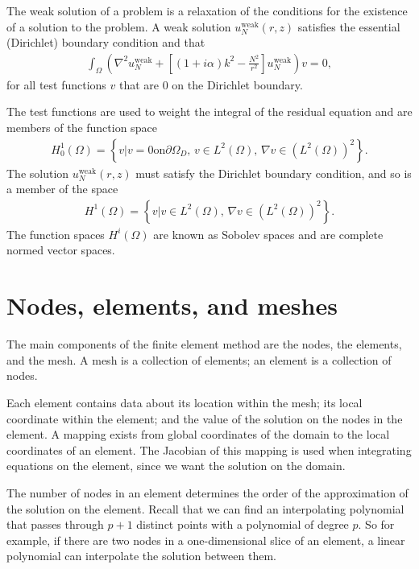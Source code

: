 The weak solution of a problem is a relaxation of the conditions for the existence of a solution to the problem.
A weak solution $u_N^{\mathrm{weak}}(r,z)$ satisfies the essential (Dirichlet) boundary condition and that
\begin{align}
	\int_\Omega \left( \nabla^2 u_N^{\mathrm{weak}} + \left[ (1+i\alpha)k^2-\frac{N^2}{r^2}\right]u_N^{\mathrm{weak}} \right) v = 0,
\end{align}
for all test functions $v$ that are 0 on the Dirichlet boundary.

The test functions are used to weight the integral of the residual equation and are members of the function space
\begin{align}
	H^1_0(\Omega) = \left\{ v | v=0 \mathrm{ on } \partial\Omega_D, \, v \in L^2(\Omega), \, \nabla v \in (L^2(\Omega))^2 \right\}.
\end{align}
The solution $u_N^{\mathrm{weak}}(r,z)$ must satisfy the Dirichlet boundary condition, and so is a member of the space
\begin{align}
	H^1(\Omega) = \left\{ v | v \in L^2(\Omega), \, \nabla v \in (L^2(\Omega))^2 \right\}.
\end{align}
The function spaces $H^i(\Omega)$ are known as Sobolev spaces and are complete normed vector spaces.






\section{Nodes, elements, and meshes}

The main components of the finite element method are the nodes, the elements, and the mesh.
A mesh is a collection of elements; an element is a collection of nodes.

Each element contains data about its location within the mesh; its local coordinate within the element; and the value of the solution on the nodes in the element.
A mapping exists from global coordinates of the domain to the local coordinates of an element.
The Jacobian of this mapping is used when integrating equations on the element, since we want the solution on the domain.

The number of nodes in an element determines the order of the approximation of the solution on the element.
Recall that we can find an interpolating polynomial that passes through $p+1$ distinct points with a polynomial of degree $p$.
So for example, if there are two nodes in a one-dimensional slice of an element, a linear polynomial can interpolate the solution between them.

